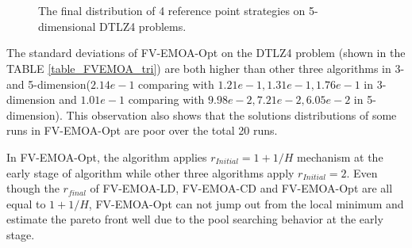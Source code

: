 \documentclass[conference]{IEEEtran}
\begin{document}
\begin{figure}[!t]
  \centering
  \quad
  \\
  \quad
  \\
  \caption{
    The final distribution of 4 reference point strategies on 5-dimensional DTLZ4 problems.
  }
  \label{iudm2}
\end{figure} 
The standard deviations of FV-EMOA-Opt on the DTLZ4 problem (shown in the TABLE \ref{table_FVEMOA_tri}) are both higher
than other three algorithms in 3- and 5-dimension($2.14e-1$  comparing with $1.21e-1, 1.31e-1, 1.76e-1$ in 3-dimension 
and $1.01e-1$ comparing with $9.98e-2, 7.21e-2, 6.05e-2$ in 5-dimension).
This observation also shows that the solutions distributions of some runs in FV-EMOA-Opt are poor over the total 20 runs.

In FV-EMOA-Opt, the algorithm applies $r_{Initial} = 1+1/H$ mechanism at the early stage of algorithm 
while other three algorithms apply $r_{Initial} = 2$.
Even though the $r_{final}$ of FV-EMOA-LD, FV-EMOA-CD and FV-EMOA-Opt are all equal to $1+1/H$, 
FV-EMOA-Opt can not jump out from the local minimum and estimate the pareto front well 
due to the pool searching behavior at the early stage. 
\end{document}
